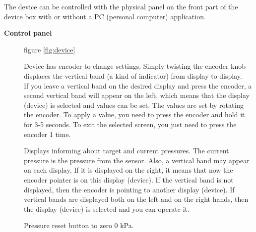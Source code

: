\documentclass[twoside, 12pt, a4paper]{refart}
\begin{document}
    The device can be controlled with the physical panel on the front part of the device box with or without a PC (personal computer) application.

  \begin{description}
    \item[\textbf{Control panel}] figure \ref{fig:device} 
    
     Device has encoder to change settings. Simply twisting the encoder knob displaces the vertical band (a kind of indicator) from display to display.\\
If you leave a vertical band on the desired display and press the encoder, a second vertical band will appear on the left, which means that the display (device) is selected and values can be set.
The values are set by rotating the encoder.
To apply a value, you need to press the encoder and hold it for 3-5 seconds.
To exit the selected screen, you just need to press the encoder 1 time.
    
     Displays informing about target and current pressures. The current pressure is the pressure from the sensor. Also, a vertical band may appear on each display. If it is displayed on the right, it means that now the encoder pointer is on this display (device). If the vertical band is not displayed, then the encoder is pointing to another display (device). If vertical bands are displayed both on the left and on the right hands, then the display (device) is selected and you can operate it.
    
     Pressure reset button to zero 0 kPa.
    
  \end{description}

  \newpage
\end{document}
